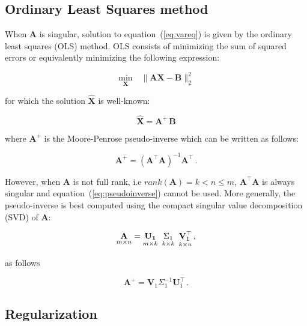 \subsection{Ordinary Least Squares method}

When $\mathbf{A}$ is singular, solution to equation~(\ref{eq:vareq}) is given
by the ordinary least squares (OLS) method. OLS consists of minimizing the sum
of squared errors or equivalently minimizing the following expression:

\begin{equation}
\label{eq:regressionproblem}
\underset{\mathbf{X}}{\text{min}} \quad \| \mathbf{A}\mathbf{\mathbf{X}} - \mathbf{B} \|_2^2
\end{equation}

\noindent for which the solution $\hat{\mathbf{X}}$ is well-known:

\begin{equation}
\label{eq:MP}
\hat{\mathbf{X}}=\mathbf{A}^{\!\!+}\,\mathbf{B}
\end{equation}

\noindent where $\mathbf{A}^{\!\!+}$ is the Moore-Penrose pseudo-inverse
which can be written as follows: 

\begin{equation}
\label{eq:pseudoinverse}
\mathbf{A}^{\!\!+}= (\mathbf{A}^{\!\!\top} \mathbf{A})^{-1}\mathbf{A}^{\!\!\top} \, .
\end{equation}

However, when $\mathbf{A}$ is not full rank, i.e
$rank(\mathbf{A})=k <  n \leq m$, $\mathbf{A}^\top \mathbf{A}$ is
always singular and equation~(\ref{eq:pseudoinverse}) cannot be used.
More generally, the pseudo-inverse is best computed using the compact
singular value decomposition (SVD) of $\mathbf{A}$:

\begin{equation}
    \label{eq:compactsvd}
    \underset{m \times n}{\mathbf{A}}=
    \underset{m \times k}{\mathbf{U_1}} \enskip
    \underset{k \times k}{\Sigma_1} \enskip
    \underset{k \times n}{\mathbf{V}_1^{\top}} \, ,
\end{equation}

\noindent as follows

\begin{equation}
\label{eq:pseudoinversesvd}
\mathbf{A}^{\!\!+} = \mathbf{V}_1 \Sigma_1^{-1} \mathbf{U}_1^\top \, .
\end{equation}



\subsection{Regularization}\label{sec:RR}

